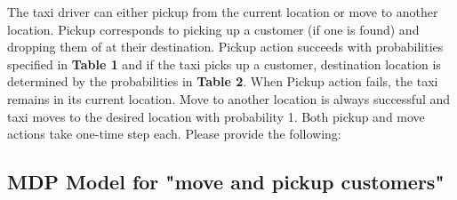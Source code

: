 \documentclass[12pt, letterpaper]{article}
\begin{document}
The taxi driver can either pickup from the current location or move to another location. 
Pickup corresponds to picking up a customer (if one is found) and dropping them of at their destination. 
Pickup action succeeds with probabilities specified in \textbf{Table 1} and if the taxi picks up a customer, destination location is determined by the probabilities in \textbf{Table 2}. 
When Pickup action fails, the taxi remains in its current location. 
Move to another location is always successful and taxi moves to the desired location with probability 1.
Both pickup and move actions take one-time step each. Please provide the following: 

\subsection{MDP Model for "move and pickup customers"}
\end{document}
